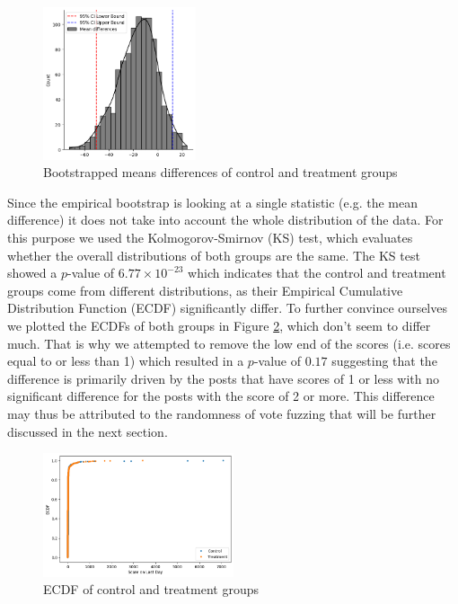 \documentclass[fleqn,12pt]{article}
\begin{document}
\begin{figure}[h]
  \centering
  \includegraphics[width=0.4\textwidth]{figures/mean_difference.png}
  \caption{Bootstrapped means differences of control and treatment groups}
  \label{fig:mean_difference}
\end{figure}

Since the empirical bootstrap is looking at a single statistic (e.g. the mean difference)
it does not take into account the whole distribution of the data. For this
purpose we used the Kolmogorov-Smirnov (KS) test, which evaluates
whether the overall distributions of both groups are the same. 
The KS test showed a $p$-value of $6.77 \times 10^{-23}$ which indicates
that the control and treatment groups come from different distributions,
as their Empirical Cumulative Distribution Function (ECDF) significantly differ.
To further convince ourselves we plotted the ECDFs of both groups in Figure \ref{fig:ecdf}, which 
don't seem to differ much.
That is why we attempted to remove the low end of the scores (i.e. scores equal to or less than 1) which resulted in a $p$-value
of $0.17$ suggesting that the difference is primarily 
driven by the posts that have scores of 1 or less with no 
significant difference for the posts with the score of 2 or more.
This difference may thus be attributed to the randomness of vote fuzzing that will
be further discussed in the next section.

\begin{figure}[h]
  \centering
  \includegraphics[width=0.5\textwidth]{figures/ecdf.png}
  \caption{ECDF of control and treatment groups}
  \label{fig:ecdf}
\end{figure}
\end{document}
